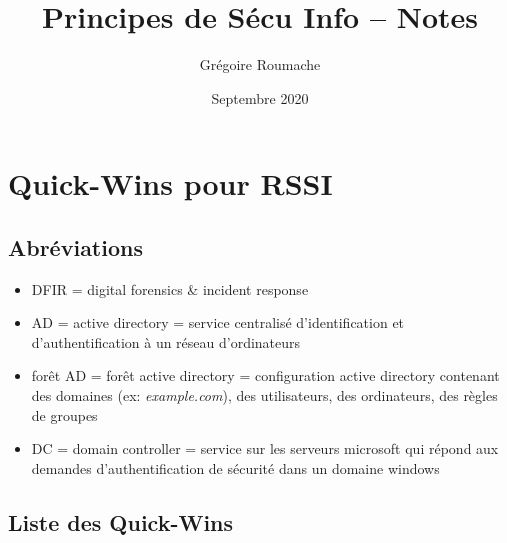 \documentclass[a4paper]{article}
\title{Principes de Sécu Info -- Notes}
\author{Grégoire Roumache}
\date{Septembre 2020}
\begin{document}
\maketitle

\tableofcontents















\section{Quick-Wins pour RSSI}










\subsection{Abréviations}





\begin{itemize}
    \item DFIR = digital forensics \& incident response
    \item AD = active directory = service centralisé d'identification et d'authentification à un réseau d'ordinateurs
    \item forêt AD = forêt active directory = configuration active directory contenant des domaines (ex: \textit{example.com}), des utilisateurs, des ordinateurs, des règles de groupes
    \item DC = domain controller = service sur les serveurs microsoft qui répond aux demandes d'authentification de sécurité dans un domaine windows
\end{itemize}










\subsection{Liste des Quick-Wins}
\end{document}
